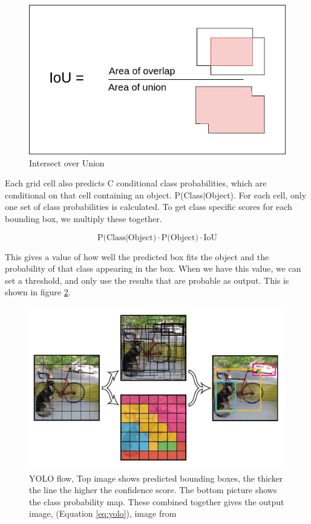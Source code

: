 \begin{figure}[h!]
\centering
\includegraphics[scale=0.5]{fig/iou.png}
\caption{Intersect over Union}
\label{fig:IoU}
\end{figure}

Each grid cell also predicts C conditional class probabilities, which are conditional on that cell containing an object. P(Class$|$Object). For each cell, only one set of class probabilities is calculated. To get class specific scores for each bounding box, we multiply these together. 

\begin{equation}
    \text{P(Class}|\text{Object)} \cdot \text{P(Object)} \cdot \text{IoU}
    \label{eq:yolo}
\end{equation}

This gives a value of how well the predicted box fits the object and the probability of that class appearing in the box. When we have this value, we can set a threshold, and only use the results that are probable as output. This is shown in figure \ref{fig:yolo_flow}.  

\begin{figure}[h!]
\centering
\includegraphics[scale=0.4]{images/YOLO_flow.png}
\caption{YOLO flow, Top image shows predicted bounding boxes, the thicker the line the higher the confidence score. The bottom picture shows the class probability map. These combined together gives the output image, (Equation \ref{eq:yolo}), image from \citep{YOLOv1}}
\label{fig:yolo_flow}
\end{figure}

